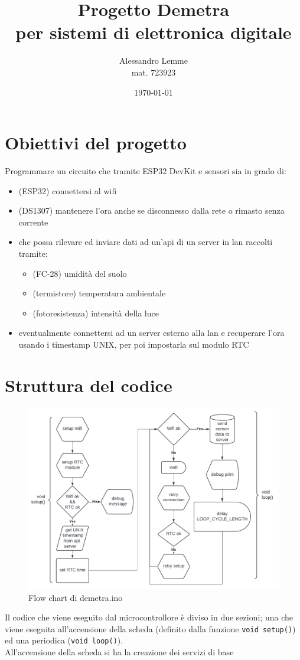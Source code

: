 \documentclass{article}
\title{
    Progetto Demetra\\
    \large per sistemi di elettronica digitale \\
}
\author{Alessandro Lemme \\mat. 723923}
\date{\today}
\begin{document}
    \maketitle
    \section{Obiettivi del progetto}
    Programmare un circuito che tramite ESP32 DevKit e sensori sia in grado di:
    \begin{itemize}
        \item (ESP32) connettersi al wifi
        \item (DS1307) mantenere l'ora anche se disconnesso dalla rete o rimasto senza corrente
        \item che possa rilevare ed inviare dati ad un'api di un server in lan raccolti tramite:
        \begin{itemize}
            \item (FC-28) umidità del suolo
            \item (termistore) temperatura ambientale
            \item (fotoresistenza) intensità della luce
        \end{itemize}
        \item eventualmente connettersi ad un server esterno alla lan e recuperare l'ora usando i timestamp UNIX, per poi impostarla sul modulo RTC
    \end{itemize}
    \section{Struttura del codice}
    \begin{figure}
        \includegraphics[width=\linewidth]{images/flow_chart.png}
        \caption{Flow chart di demetra.ino}
        \label{flow_chart}
    \end{figure}
    Il codice che viene eseguito dal microcontrollore è diviso in due sezioni; una che viene eseguita all'accensione della scheda (definito dalla funzione \texttt{void setup()}) ed una periodica (\texttt{void loop()}). \\
    All'accensione della scheda si ha la creazione dei servizi di base
\end{document}
